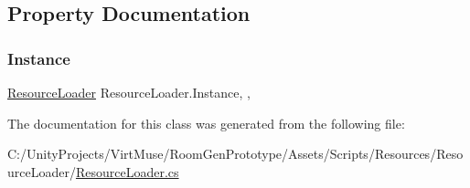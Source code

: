 \subsection{Property Documentation}
\mbox{\label{class_resource_loader_a66d4b7f32938dad50d13f48e362b7b76}} 
\subsubsection{\texorpdfstring{Instance}{Instance}}
{\footnotesize\ttfamily \mbox{\hyperlink{class_resource_loader}{Resource\+Loader}} Resource\+Loader.\+Instance\hspace{0.3cm}{\ttfamily [static]}, {\ttfamily [get]}, {}}



The documentation for this class was generated from the following file\+:\begin{DoxyCompactItemize}
\item 
C\+:/\+Unity\+Projects/\+Virt\+Muse/\+Room\+Gen\+Prototype/\+Assets/\+Scripts/\+Resources/\+Resource\+Loader/\mbox{\hyperlink{_resource_loader_8cs}{Resource\+Loader.\+cs}}\end{DoxyCompactItemize}
